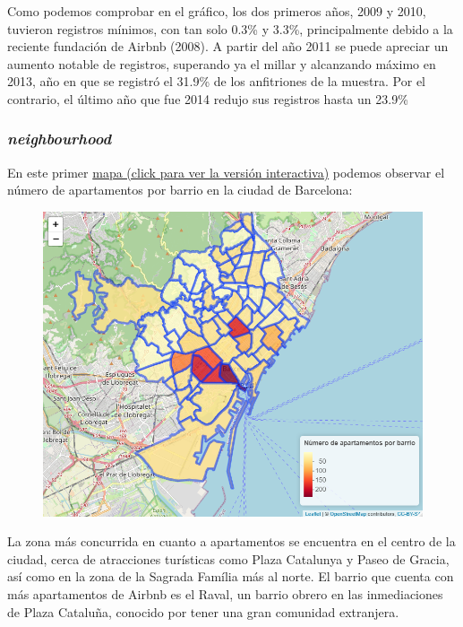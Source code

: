 \documentclass{article}
\begin{document}
Como podemos comprobar en el gráfico, los dos primeros años, 2009 y 2010, tuvieron registros mínimos, con tan solo 0.3\% y 3.3\%, principalmente debido a la reciente fundación de Airbnb (2008). A partir del año 2011 se puede apreciar un aumento notable de registros, superando ya el millar y alcanzando máximo en 2013, año en que se registró el 31.9\% de los anfitriones de la muestra. Por el contrario, el último año que fue 2014 redujo sus registros hasta un 23.9\%


\clearpage
\subsubsection{\emph{neighbourhood}}
En este primer \href{https://rpubs.com/marctotti5/754602}{mapa (click para ver la versión interactiva)} podemos observar el número de apartamentos por barrio en la ciudad de Barcelona:

\vspace{0.35cm}
\begin{figure}[h]
\hspace*{-0.15cm}
\centering
\includegraphics[scale = 0.7]{grafico_3}
\end{figure}
\vspace{0.35cm}

La zona más concurrida en cuanto a apartamentos se encuentra en el centro de la ciudad, cerca de atracciones turísticas como Plaza Catalunya y Paseo de Gracia, así como en la zona de la Sagrada Família más al norte. El barrio que cuenta con más apartamentos de Airbnb es el Raval, un barrio obrero en las inmediaciones de Plaza Cataluña, conocido por tener una gran comunidad extranjera. 
\end{document}
